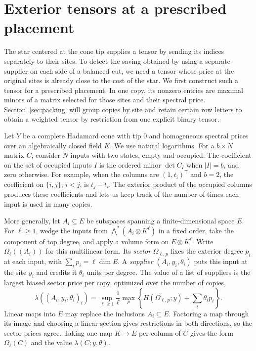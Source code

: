 \section{Exterior tensors at a prescribed placement}\label{sec:exterior}

The star centered at the cone tip supplies a tensor by sending its
indices separately to their sites. To detect the saving obtained by
using a separate supplier on each side of a balanced cut, we need a
tensor whose price at the original sites is already close to the cost
of the star. We first construct such a tensor for a prescribed
placement. In one copy, its nonzero entries are maximal minors of a
matrix selected for those sites and their spectral price.
Section~\ref{sec:packing} will group copies by site and retain certain
row letters to obtain a weighted tensor by restriction from one
explicit binary tensor.

Let $Y$ be a complete Hadamard cone with tip $0$ and homogeneous spectral
prices over an algebraically closed field $K$. We use natural logarithms.
For a $b\times N$ matrix $C$, consider $N$ inputs with two states,
empty and occupied. The coefficient on the set of occupied inputs $I$
is the ordered minor $\det C_I$ when $|I|=b$, and zero otherwise.
For example, when the columns are $(1,t_i)^{\mathsf T}$ and $b=2$,
the coefficient on $\{i,j\}$, $i<j$, is $t_j-t_i$. The exterior
product of the occupied columns produces these coefficients and lets
us keep track of the number of times each input is used in many copies.

More generally, let $A_i\subseteq E$ be subspaces spanning a
finite-dimensional space $E$. For $\ell\ge1$, wedge the inputs from
$\bigwedge^*(A_i\otimes K^\ell)$ in a fixed order, take the component
of top degree, and apply a volume form on $E\otimes K^\ell$. Write
$\Omega_\ell((A_i))$ for this multilinear form. Its \emph{sector}
$\Omega_{\ell,p}$ fixes the exterior degree $p_i$ at each input, with
$\sum_i p_i=\ell\dim E$. A \emph{supplier} $(A_i,y_i,\theta_i)$ puts
this input at the site $y_i$ and credits it $\theta_i$ units per degree.
The value of a list of suppliers is the largest biased sector price per
copy, optimized over the number of copies,
\begin{equation}\label{ext:value}
 \lambda((A_i,y_i,\theta_i)_i)
 =\sup_{\ell\ge1}\frac1\ell
   \max_p\left\{H(\Omega_{\ell,p};y)+\sum_i\theta_i p_i\right\}.
\end{equation}
Linear maps into $E$ may replace the inclusions $A_i\subseteq E$.
Factoring a map through its image and choosing a linear section gives
restrictions in both directions, so the sector prices agree. Taking
one map $K\to E$ per column of $C$ gives the form $\Omega_\ell(C)$
and the value $\lambda(C;y,\theta)$.

